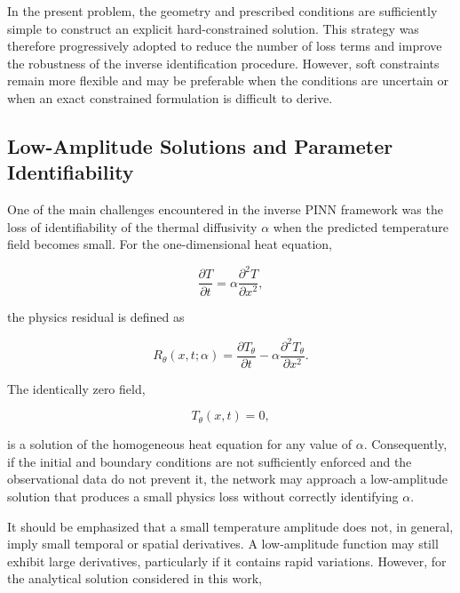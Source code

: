 In the present problem, the geometry and prescribed conditions are sufficiently
simple to construct an explicit hard-constrained solution. This strategy was
therefore progressively adopted to reduce the number of loss terms and improve
the robustness of the inverse identification procedure. However, soft
constraints remain more flexible and may be preferable when the conditions are
uncertain or when an exact constrained formulation is difficult to derive.

\subsection{Low-Amplitude Solutions and Parameter Identifiability}

One of the main challenges encountered in the inverse PINN framework was the
loss of identifiability of the thermal diffusivity $\alpha$ when the predicted
temperature field becomes small. For the one-dimensional heat equation,

\begin{equation}
\frac{\partial T}{\partial t}
=
\alpha
\frac{\partial^2 T}{\partial x^2},
\end{equation}

the physics residual is defined as

\begin{equation}
R_\theta(x,t;\alpha)
=
\frac{\partial T_\theta}{\partial t}
-
\alpha
\frac{\partial^2 T_\theta}{\partial x^2}.
\end{equation}

The identically zero field,

\begin{equation}
T_\theta(x,t)=0,
\end{equation}

is a solution of the homogeneous heat equation for any value of $\alpha$.
Consequently, if the initial and boundary conditions are not sufficiently
enforced and the observational data do not prevent it, the network may approach
a low-amplitude solution that produces a small physics loss without correctly
identifying $\alpha$.

It should be emphasized that a small temperature amplitude does not, in
general, imply small temporal or spatial derivatives. A low-amplitude function
may still exhibit large derivatives, particularly if it contains rapid
variations. However, for the analytical solution considered in this work,


